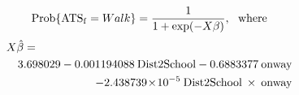 \[{\rm Prob}\{{\rm ATS_f}=Walk\} = \frac{1}{1+\exp(-X\beta)}, {\rm \ \ where} \\ \]
\begin{eqnarray*}
\lefteqn{X\hat{\beta}=}\\
& & 3.698029 -0.001194088\:{\rm Dist2School} -0.6883377\:{\rm onway} \\
& &  -2.438739\!\times\!10^{-5}\:{\rm Dist2School}\:\times\:{\rm onway} \\
\end{eqnarray*}
